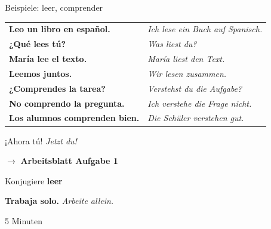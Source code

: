 \documentclass[aspectratio=169, 11pt]{beamer}
\newcommand{\seriftext}[1]{{\fontfamily{ppl}\selectfont #1}}
\newcommand{\es}[1]{\seriftext{\textbf{#1}}}
\newcommand{\de}[1]{\textit{\textcolor{mittelgrau}{#1}}}
\newcommand{\abmark}[1]{{\Large$\rightarrow$ \textbf{Arbeitsblatt Aufgabe #1}}}
\newcommand{\zeit}[1]{{\small\textcolor{mittelgrau}{#1}}}
\begin{document}
\begin{frame}{Beispiele: leer, comprender}
    \vspace{0.5cm}

    \renewcommand{\arraystretch}{1.8}
    \begin{tabular}{ll}
        \es{Leo un libro en español.} & \de{Ich lese ein Buch auf Spanisch.} \\
        \es{¿Qué lees tú?} & \de{Was liest du?} \\
        \es{María lee el texto.} & \de{María liest den Text.} \\
        \es{Leemos juntos.} & \de{Wir lesen zusammen.} \\[0.5cm]
        \es{¿Comprendes la tarea?} & \de{Verstehst du die Aufgabe?} \\
        \es{No comprendo la pregunta.} & \de{Ich verstehe die Frage nicht.} \\
        \es{Los alumnos comprenden bien.} & \de{Die Schüler verstehen gut.} \\
    \end{tabular}
\end{frame}

\begin{frame}{¡Ahora tú! \de{Jetzt du!}}
    \vspace{1cm}

    \begin{center}
        \abmark{1}

        \vspace{0.8cm}

        {\large Konjugiere \es{leer}}

        \vspace{0.8cm}

        \es{Trabaja solo.} \de{Arbeite allein.}

        \vspace{0.5cm}

        \zeit{5 Minuten}
    \end{center}
\end{frame}

\end{document}
